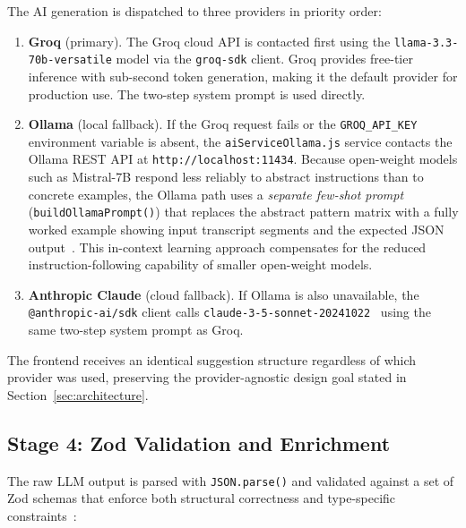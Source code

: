 The AI generation is dispatched to three providers in priority order:

\begin{enumerate}
  \item \textbf{Groq} (primary). The Groq cloud API is contacted first
  using the \texttt{llama-3.3-70b-versatile} model via the
  \texttt{groq-sdk} client. Groq provides free-tier inference with
  sub-second token generation, making it the default provider for
  production use. The two-step system prompt is used directly.

  \item \textbf{Ollama} (local fallback). If the Groq request fails or
  the \texttt{GROQ\_API\_KEY} environment variable is absent, the
  \texttt{aiServiceOllama.js} service contacts the Ollama REST API at
  \texttt{http://localhost:11434}. Because open-weight models such as
  Mistral-7B respond less reliably to abstract instructions than to
  concrete examples, the Ollama path uses a \emph{separate few-shot
  prompt} (\texttt{buildOllamaPrompt()}) that replaces the abstract
  pattern matrix with a fully worked example showing input transcript
  segments and the expected JSON output~\cite{brown2020}. This
  in-context learning approach compensates for the reduced
  instruction-following capability of smaller open-weight models.

  \item \textbf{Anthropic Claude} (cloud fallback). If Ollama is also
  unavailable, the \texttt{@anthropic-ai/sdk} client calls
  \texttt{claude-3-5-sonnet-20241022}~\cite{anthropic2024} using the
  same two-step system prompt as Groq.
\end{enumerate}

The frontend receives an identical suggestion structure regardless of
which provider was used, preserving the provider-agnostic design
goal stated in Section~\ref{sec:architecture}.

\subsection{Stage 4: Zod Validation and Enrichment}

The raw LLM output is parsed with \texttt{JSON.parse()} and validated
against a set of Zod schemas that enforce both structural correctness
and type-specific constraints~\cite{white2023}:

